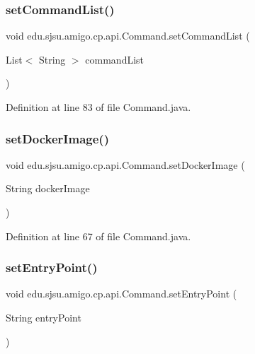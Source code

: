 \subsubsection{\texorpdfstring{set\+Command\+List()}{setCommandList()}}
{\footnotesize\ttfamily void edu.\+sjsu.\+amigo.\+cp.\+api.\+Command.\+set\+Command\+List (\begin{DoxyParamCaption}\item[{List$<$ String $>$}]{command\+List }\end{DoxyParamCaption})}



Definition at line 83 of file Command.\+java.

\mbox{\label{classedu_1_1sjsu_1_1amigo_1_1cp_1_1api_1_1_command_a4b375c29b1e01240bfc7f8bafe5626c3}} 
\subsubsection{\texorpdfstring{set\+Docker\+Image()}{setDockerImage()}}
{\footnotesize\ttfamily void edu.\+sjsu.\+amigo.\+cp.\+api.\+Command.\+set\+Docker\+Image (\begin{DoxyParamCaption}\item[{String}]{docker\+Image }\end{DoxyParamCaption})}



Definition at line 67 of file Command.\+java.

\mbox{\label{classedu_1_1sjsu_1_1amigo_1_1cp_1_1api_1_1_command_a43c60eb1ef3143276a0110f0e081db52}} 
\subsubsection{\texorpdfstring{set\+Entry\+Point()}{setEntryPoint()}}
{\footnotesize\ttfamily void edu.\+sjsu.\+amigo.\+cp.\+api.\+Command.\+set\+Entry\+Point (\begin{DoxyParamCaption}\item[{String}]{entry\+Point }\end{DoxyParamCaption})}



